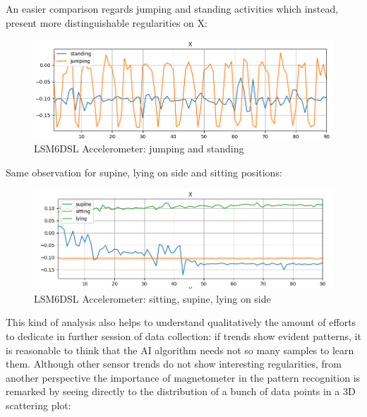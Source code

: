 An easier comparison regards jumping and standing activities which instead, present more distinguishable regularities on X:
\begin{figure}[H]
		\hfill\includegraphics[scale=0.8]{figures/plot_ACC_LSM6DSL_DS_standing_jumping_X.png}\hspace*{\fill}
		\caption{LSM6DSL Accelerometer: jumping and standing}\label{fig:6}
		\centering
\end{figure} 
Same observation for supine, lying on side and sitting positions:
\begin{figure}[H]
	\hfill\includegraphics[scale=0.8]{figures/plot_ACC_LSM6DSL_DS_supine_sitting_lying_X.png}\hspace*{\fill}
	\caption{LSM6DSL Accelerometer: sitting, supine, lying on side}\label{fig:7}
	\centering
\end{figure} 
This kind of analysis also helps to understand qualitatively the amount of efforts to dedicate in further session of data collection: if trends show evident patterns, it is reasonable to think that the AI algorithm needs not so many samples to learn them. Although other sensor trends do not show interesting regularities, from another perspective the importance of magnetometer in the pattern recognition is remarked by seeing directly to the distribution of a bunch of data points in a 3D scattering plot:
